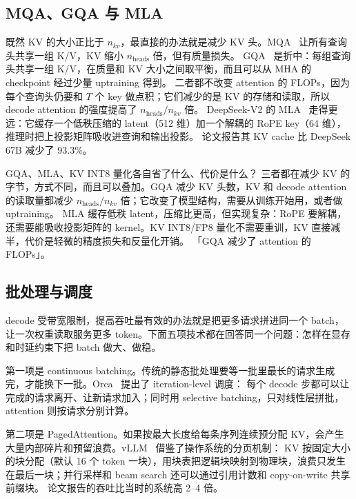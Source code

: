 \subsection{MQA、GQA 与 MLA}

既然 KV 的大小正比于 $n_{kv}$，最直接的办法就是减少 KV 头。MQA~\cite{shazeer2019fast} 让所有查询头共享一组 K/V，KV 缩小 $n_{\text{heads}}$ 倍，但有质量损失。
GQA~\cite{ainslie2023gqa} 是折中：每组查询头共享一组 K/V，在质量和 KV 大小之间取平衡，而且可以从 MHA 的 checkpoint 经过少量 uptraining 得到。
二者都不改变 attention 的 FLOPs，因为每个查询头仍要和 $T$ 个 key 做点积；它们减少的是 KV 的存储和读取，所以 decode attention 的强度提高了 $n_{\text{heads}}/n_{kv}$ 倍。
DeepSeek-V2 的 MLA~\cite{deepseekai2024v2} 走得更远：它缓存一个低秩压缩的 latent（512 维）加一个解耦的 RoPE key（64 维），推理时把上投影矩阵吸收进查询和输出投影。
论文报告其 KV cache 比 DeepSeek 67B 减少了 93.3\%。

\begin{qa}{GQA、MLA、KV INT8 量化各自省了什么、代价是什么？}
\ans 三者都在减少 KV 的字节，方式不同，而且可以叠加。GQA 减少 KV 头数，KV 和 decode attention 的读取量都减少 $n_{\text{heads}}/n_{kv}$ 倍；它改变了模型结构，需要从训练开始用，或者做 uptraining。
MLA 缓存低秩 latent，压缩比更高，但实现复杂：RoPE 要解耦，还需要能吸收投影矩阵的 kernel。KV INT8/FP8 量化不需要重训，KV 直接减半，代价是轻微的精度损失和反量化开销。
\wrong 「GQA 减少了 attention 的 FLOPs」。
\end{qa}

\subsection{批处理与调度}

decode 受带宽限制，提高吞吐最有效的办法就是把更多请求拼进同一个 batch，让一次权重读取服务更多 token。下面五项技术都在回答同一个问题：怎样在显存和时延约束下把 batch 做大、做稳。

第一项是 continuous batching。传统的静态批处理要等一批里最长的请求生成完，才能换下一批。Orca~\cite{yu2022orca} 提出了 iteration-level 调度：
每个 decode 步都可以让完成的请求离开、让新请求加入；同时用 selective batching，只对线性层拼批，attention 则按请求分别计算。

第二项是 PagedAttention。如果按最大长度给每条序列连续预分配 KV，会产生大量内部碎片和预留浪费。vLLM~\cite{kwon2023vllm} 借鉴了操作系统的分页机制：
KV 按固定大小的块分配（默认 16 个 token 一块），用块表把逻辑块映射到物理块，浪费只发生在最后一块；并行采样和 beam search 还可以通过引用计数和 copy-on-write 共享前缀块。
论文报告的吞吐比当时的系统高 2--4 倍。

